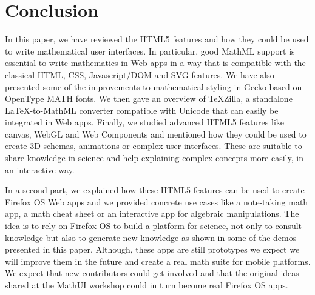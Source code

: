\section*{Conclusion}

In this paper, we have reviewed the HTML5 features and how they could be used
to write mathematical user interfaces. In particular, good MathML support is
essential to write mathematics in Web apps in a way that is compatible with the
classical HTML, CSS, Javascript/DOM and SVG features. We have also presented
some of the improvements to mathematical styling in Gecko based on OpenType
MATH fonts. We then gave an overview of TeXZilla, a standalone LaTeX-to-MathML
converter compatible with Unicode that can easily be integrated in Web apps.
Finally, we studied advanced HTML5 features like canvas, WebGL and Web
Components and mentioned how they could be used to create 3D-schemas, animations
or complex user interfaces.
These are suitable to share knowledge in science and help
explaining complex concepts more easily, in an interactive way.

In a second part, we explained how these HTML5 features can be used to create
Firefox OS Web apps and we provided concrete use cases like a note-taking math
app, a math cheat sheet or an interactive app for algebraic manipulations.
The idea is to rely on Firefox OS to build a platform for science, not only to
consult knowledge but also to generate new knowledge as shown in some of the
demos presented in this paper. Although, these apps are still prototypes we
expect we will improve them in the future and create a real math suite for
mobile platforms. We expect that new contributors could get involved and that
the original ideas shared at the MathUI workshop could in turn become real
Firefox OS apps.
